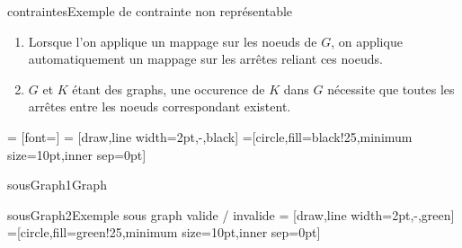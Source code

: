 \documentclass[a4paper, 12pt]{article}
\begin{document}
\begin{figu}{contraintes}{Exemple de contrainte non représentable}
\begin{enumerate}
    \item Lorsque l'on applique un mappage sur les noeuds de \(G\), on applique automatiquement un mappage sur les arrêtes reliant ces noeuds.

    \item \(G\) et \(K\) étant des graphs, une occurence de \(K\) dans \(G\) nécessite que toutes les arrêtes entre les noeuds correspondant existent.

  \end{enumerate}

   = [font=\small]
   = [draw,line width=2pt,-,black]
  =[circle,fill=black!25,minimum size=10pt,inner sep=0pt]
  \begin{myfig}{sousGraph1}{Graph}
  \end{myfig}


  \begin{myfig}{sousGraph2}{Exemple sous graph valide / invalide}
     = [draw,line width=2pt,-,green]
    =[circle,fill=green!25,minimum size=10pt,inner sep=0pt]
  \end{myfig}


\end{figu}
\end{document}
